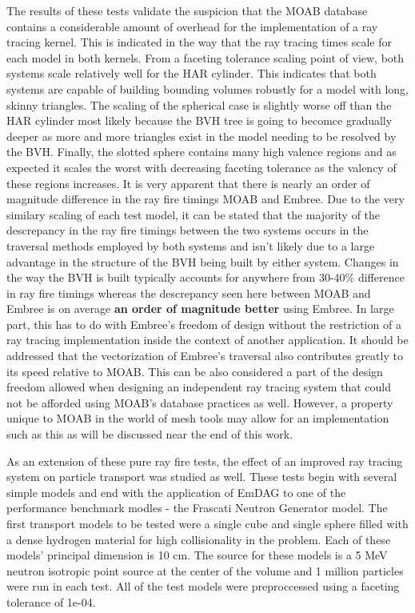 \documentclass[10pt, a4paper]{article}
\begin{document}
The results of these tests validate the suspicion that the MOAB database contains a considerable amount of overhead for the implementation of a ray tracing kernel. This is indicated in the way that the ray tracing times scale for each model in both kernels. From a faceting tolerance scaling point of view, both systems scale relatively well for the HAR cylinder. This indicates that both systems are capable of building bounding volumes robustly for a model with long, skinny triangles. The scaling of the spherical case is slightly worse off than the HAR cylinder most likely because the BVH tree is going to becomce gradually deeper as more and more triangles exist in the model needing to be resolved by the BVH. Finally, the slotted sphere contains many high valence regions and as expected it scales the worst with decreasing faceting tolerance as the valency of these regions increases. It is very apparent that there is nearly an order of magnitude difference in the ray fire timings MOAB and Embree. Due to the very similary scaling of each test model, it can be stated that the majority of the descrepancy in the ray fire timings between the two systems occurs in the traversal methods employed by both systems and isn't likely due to a large advantage in the structure of the BVH being built by either system. Changes in the way the BVH is built typically accounts for anywhere from 30-40\% difference in ray fire timings whereas the descrepancy seen here between MOAB and Embree is on average \textbf{an order of magnitude better} using Embree. In large part, this has to do with Embree's freedom of design without the restriction of a ray tracing implementation inside the context of another application. It should be addressed that the vectorization of Embree's traversal also contributes greatly to its speed relative to MOAB. This can be also considered a part of the design freedom allowed when designing an independent ray tracing system that could not be afforded using MOAB's database practices as well. However, a property unique to MOAB in the world of mesh tools may allow for an implementation such as this as will be discussed near the end of this work.

As an extension of these pure ray fire tests, the effect of an improved ray tracing system on particle transport was studied as well. These tests begin with several simple models and end with the application of EmDAG to one of the performance benchmark modles - the Frascati Neutron Generator model. The first transport models to be tested were a single cube and single sphere filled with a dense hydrogen material for high collisionality in the problem. Each of these models' principal dimension is 10 cm. The source for these models is a 5 MeV neutron isotropic point source at the center of the volume and 1 million particles were run in each test. All of the test models were preproccessed using a faceting tolerance of 1e-04.
\end{document}
